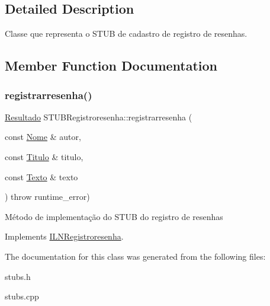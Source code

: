\subsection{Detailed Description}
Classe que representa o S\+T\+UB de cadastro de registro de resenhas. 

\subsection{Member Function Documentation}
\mbox{\label{classSTUBRegistroresenha_a98762ff953cb017d00a225a0772b6394}} 
\subsubsection{\texorpdfstring{registrarresenha()}{registrarresenha()}}
{\footnotesize\ttfamily \hyperlink{classResultado}{Resultado} S\+T\+U\+B\+Registroresenha\+::registrarresenha (\begin{DoxyParamCaption}\item[{const \hyperlink{classNome}{Nome} \&}]{autor,  }\item[{const \hyperlink{classTitulo}{Titulo} \&}]{titulo,  }\item[{const \hyperlink{classTexto}{Texto} \&}]{texto }\end{DoxyParamCaption}) throw  runtime\+\_\+error) \hspace{0.3cm}{\ttfamily [virtual]}}

Método de implementação do S\+T\+UB do registro de resenhas 

Implements \hyperlink{classILNRegistroresenha}{I\+L\+N\+Registroresenha}.



The documentation for this class was generated from the following files\+:\begin{DoxyCompactItemize}
\item 
stubs.\+h\item 
stubs.\+cpp\end{DoxyCompactItemize}
